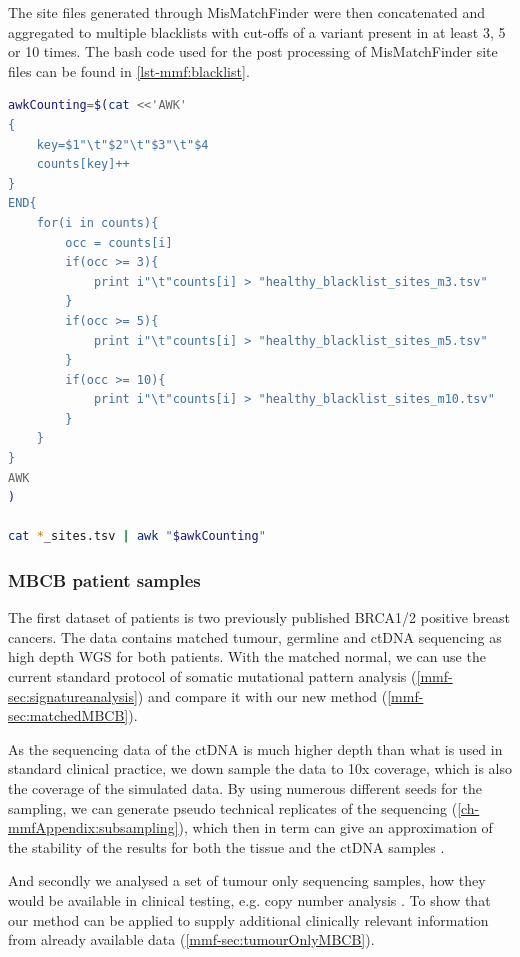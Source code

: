 The site files generated through MisMatchFinder were then concatenated and aggregated to multiple blacklists with cut-offs of a variant present in at least 3, 5 or 10 times. The bash code used for the post processing of MisMatchFinder site files can be found in \autoref{lst-mmf:blacklist}.


\begin{lstlisting}[language=bash, caption=Blacklist postprocessing, label={lst-mmf:blacklist}]
awkCounting=$(cat <<'AWK'
{
    key=$1"\t"$2"\t"$3"\t"$4
    counts[key]++
}
END{
    for(i in counts){
        occ = counts[i]
        if(occ >= 3){
            print i"\t"counts[i] > "healthy_blacklist_sites_m3.tsv"
        }
        if(occ >= 5){
            print i"\t"counts[i] > "healthy_blacklist_sites_m5.tsv"
        }
        if(occ >= 10){
            print i"\t"counts[i] > "healthy_blacklist_sites_m10.tsv"
        }
    }
}
AWK
)

cat *_sites.tsv | awk "$awkCounting"
\end{lstlisting}





\subsubsection{MBCB patient samples}
\label{mmf-sec:brcapatients}
The first dataset of patients is two previously published BRCA1/2 positive breast cancers. The data contains matched tumour, germline and ctDNA sequencing as high depth WGS for both patients. With the matched normal, we can use the current standard protocol of somatic mutational pattern analysis (\autoref{mmf-sec:signatureanalysis}) and compare it with our new method (\autoref{mmf-sec:matchedMBCB}). 

As the sequencing data of the ctDNA is much higher depth than what is used in standard clinical practice, we down sample the data to 10x coverage, which is also the coverage of the simulated data. By using numerous different seeds for the sampling, we can generate pseudo technical replicates of the sequencing (\autoref{ch-mmfAppendix:subsampling}), which then in term can give an approximation of the stability of the results for both the tissue and the ctDNA samples .

And secondly we analysed a set of tumour only sequencing samples, how they would be available in clinical testing, e.g. copy number analysis \cite{Homburger2019,Chen2021}. To show that our method can be applied to supply additional clinically relevant information from already available data (\autoref{mmf-sec:tumourOnlyMBCB}). 

